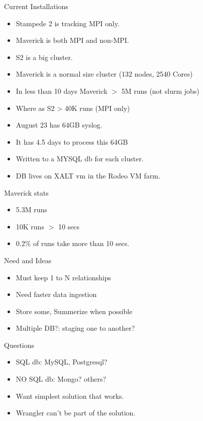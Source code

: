 \documentclass{beamer}
\begin{document}
\begin{frame}{Current Installations}
  \begin{itemize}
    \item Stampede 2 is tracking MPI only.
    \item Maverick is both MPI and non-MPI.
    \item S2 is a big cluster.
    \item Maverick is a normal size cluster (132 nodes, 2540 Cores)
    \item In less than 10 days Maverick $>$ 5M runs (not slurm jobs)
    \item Where as S2 > 40K runs (MPI only)
    \item August 23 has 64GB syslog. 
    \item It has 4.5 days to process this 64GB
    \item Written to a MYSQL db for each cluster.
    \item DB lives on XALT vm in the Rodeo VM farm.
  \end{itemize}
\end{frame}

\begin{frame}{Maverick stats}
  \begin{itemize}
    \item 5.3M runs
    \item 10K runs $>$ 10 secs
    \item 0.2\% of runs take more than 10 secs.
  \end{itemize}
\end{frame}

\begin{frame}{Need and Ideas}
  \begin{itemize}
    \item Must keep 1 to N relationships
    \item Need faster data ingestion
    \item Store some, Summerize when possible
    \item Multiple DB?: staging one to another?
  \end{itemize}
\end{frame}

\begin{frame}{Questions}
  \begin{itemize}
    \item SQL db: MySQL, Postgresql?
    \item NO SQL db: Mongo? others?
    \item Want simplest solution that works.
    \item Wrangler can't be part of the solution.
  \end{itemize}
\end{frame}
\end{document}
